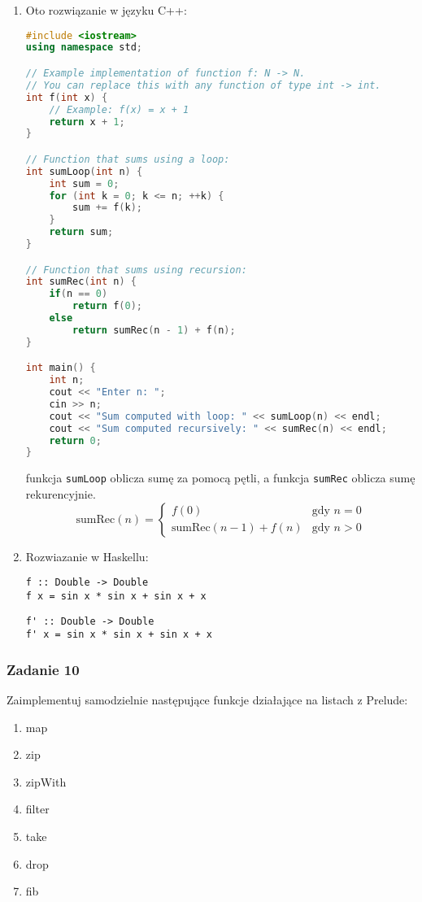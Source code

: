 \documentclass[11pt,a4paper]{article}
\begin{document}
\begin{enumerate}
    \item Oto rozwiązanie w języku C++:
        \begin{lstlisting}[language=C++]
#include <iostream>
using namespace std;

// Example implementation of function f: N -> N.
// You can replace this with any function of type int -> int.
int f(int x) {
    // Example: f(x) = x + 1
    return x + 1;
}

// Function that sums using a loop:
int sumLoop(int n) {
    int sum = 0;
    for (int k = 0; k <= n; ++k) {
        sum += f(k);
    }
    return sum;
}

// Function that sums using recursion:
int sumRec(int n) {
    if(n == 0)
        return f(0);
    else
        return sumRec(n - 1) + f(n);
}

int main() {
    int n;
    cout << "Enter n: ";
    cin >> n;
    cout << "Sum computed with loop: " << sumLoop(n) << endl;
    cout << "Sum computed recursively: " << sumRec(n) << endl;
    return 0;
}
\end{lstlisting}
    funkcja \texttt{sumLoop} oblicza sumę za pomocą pętli, a funkcja \texttt{sumRec} oblicza sumę rekurencyjnie.
    \[
        \text{sumRec}(n) = \left\{
            \begin{array}{ll}
                f(0) & \text{gdy } n = 0 \\
                \text{sumRec}(n-1) + f(n) & \text{gdy } n > 0
            \end{array}
        \right.
    \]
\item Rozwiazanie w Haskellu:
    \begin{Verbatim}[frame=single]
f :: Double -> Double
f x = sin x * sin x + sin x + x
    \end{Verbatim}
    \begin{Verbatim}[frame=single]
f' :: Double -> Double
f' x = sin x * sin x + sin x + x
    \end{Verbatim}
\end{enumerate}

\subsubsection{Zadanie 10}
Zaimplementuj samodzielnie następujące funkcje działające na listach z Prelude:
\begin{enumerate}
    \item map
    \item zip
    \item zipWith
    \item filter
    \item take
    \item drop
    \item fib
\end{enumerate}
\end{document}
